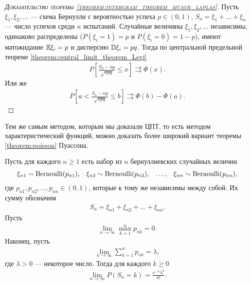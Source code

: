 \documentclass[../main.tex]{subfiles}
\begin{document}
\begin{proof}[\normalfont\textsc{Доказательство теоремы \ref{theorem:intergram_theorem_muavr_laplas}}]
 Пусть $ \xi_1, \xi_2, \ldots $ --- схема Бернулли с вероятностью успеха $ p \in (0,1) $, $ S_n = \xi_1 + \ldots + \xi_n $ --- число успехов среди $ n $ испытаний. Случайные величины $ \xi_1, \xi_2, \ldots $ независимы, одинаково распределены ($ P(\xi_i = 1) = p $ и $ P(\xi_i = 0) = 1 - p $), имеют матожидание $ \mathbb E\xi_i = p $ и дисперсию $ \mathbb D\xi_i = pq $. Тогда по центральной предельной теореме \ref{theorem:central_limit_theorem_Levi}
 \begin{align*}
  P \left[ \frac{S_n - np}{\sqrt{npq}} \leqslant x \right] \rightrightarrows \Phi(x).
 \end{align*} Или же
 \begin{align*}
  P \left[ a < \frac{S_n-np}{\sqrt{npq}} \leqslant b \right] \rightrightarrows \Phi(b) - \Phi(a).
 \end{align*}
\end{proof}

Тем же самым методом, которым мы доказали ЦПТ, то есть методом характеристический функций, можно доказать более широкий вариант теоремы \ref{theorem:poisson} Пуассона.

\begin{thm}[Пуассона]
 \label{theorem:poissonx}
 Пусть для каждого $ n \geqslant 1 $ есть набор из $ n $ бернуллиевских случайных величин
 \begin{align*}
  \xi_{n1} \sim \mathrm{Bernoulli}(p_{n1}), && \xi_{n2}\sim\mathrm{Bernoulli}(p_{n2}), && \ldots, && \xi_{nn} \sim \mathrm{Bernoulli}(p_{nn}),
 \end{align*} где $ p_{n1}, p_{n2}, \ldots, p_{nn}\in(0,1) $, которые к тому же независимы между собой. Их сумму обозначим
 \begin{align*}
  S_n = \xi_{n1} + \xi_{n 2} + \ldots + \xi_{n n}.
 \end{align*} Пусть
 \begin{align}
  \label{eq:theorem:poissonx:lim_of_max_of_p_n_k}
  \lim_{n \to \infty} \max_{k=1}^{n} p_{nk} = 0.
 \end{align} Наконец, пусть
 \begin{align}
  \label{eq:theorem:poissonx:lim_of_sum_of_p_n_k}
  \lim_{n \to \infty} \sum_{k=1}^{n} p_{nk} = \lambda,
 \end{align} где $ \lambda > 0 $ --- некоторое число. Тогда для каждого $ k \geqslant 0 $
 \begin{align}
  \label{eq:theorem:possionx:convergence}
  \lim_{n \to \infty} P(S_n = k) = \frac{e^{-\lambda}\lambda^{k}}{k!}.
 \end{align}
\end{thm}
\end{document}
